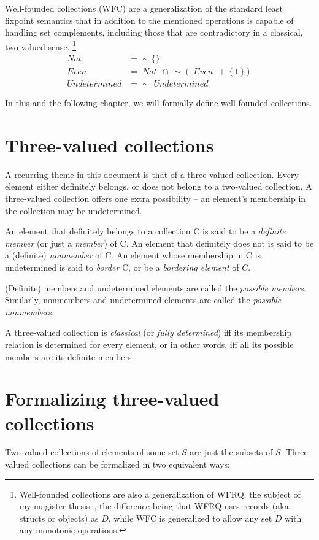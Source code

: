 \documentclass[oneside,12pt]{book}
\theoremstyle{definition}
\theoremstyle{remark}
\newcommand{\ct}{{\sim}} %
\newcommand\var[1]{\mathop{\mathit{#1}}\nolimits}
\begin{document}
Well-founded collections (WFC) are a generalization of the standard least fixpoint
semantics that in addition to the mentioned operations is capable of handling
set complements, including those that are contradictory in a classical,
two-valued sense.%
%
\footnote{Well-founded collections are also a generalization of WFRQ, the subject
of my magister thesis~\cite{MikusinecMgrThesis}, the difference being that WFRQ
uses records (aka. structs or objects) as $D$, while WFC is generalized to allow
any set $D$ with any monotonic operations.}
%
\begin{align*}
  \var{Nat} &= \ct\{\} \\
  \var{Even} &= \var{Nat}\,\cap~\ct(\var{Even}\,+\,\{\,1\,\}) \\
  \var{Undetermined} &= \ct\var{Undetermined}
\end{align*}

In this and the following chapter, we will formally define well-founded collections.

\section{Three-valued collections}
A recurring theme in this document is that of a three-valued collection.
Every element either definitely belongs, or does not belong to a two-valued collection.
A three-valued collection offers one extra possibility -- an element's membership in the
collection may be undetermined.

An element that definitely belongs to a collection C is said to be a \textit{definite
member} (or just a \textit{member}) of C. An element that definitely does not is
said to be a (definite) \textit{nonmember} of C. An element whose membership in C
is undetermined is said to \textit{border} C, or be a \textit{bordering element} of $C$.

(Definite) members and undetermined elements are called the \textit{possible members}.
Similarly, nonmembers and undetermined elements are called the \textit{possible
nonmembers}.

A three-valued collection is \textit{classical} (or \textit{fully determined}) iff
its membership relation is determined for every element, or in other words,
iff all its possible members are its definite members.

\section{Formalizing three-valued collections}
Two-valued collections of elements of some set $S$ are just the subsets of $S$.
Three-valued collections can be formalized in two equivalent ways:
\end{document}
